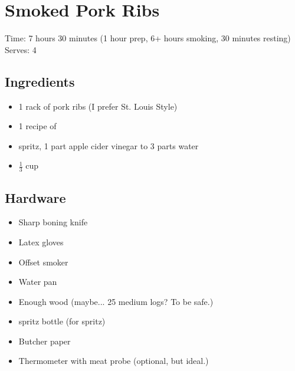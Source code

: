 \section{Smoked Pork Ribs}
\label{smokedPorkRibs}
\setcounter{secnumdepth}{0}
Time: 7 hours 30 minutes (1 hour prep, 6+ hours smoking, 30 minutes resting)
Serves: 4

\begin{multicols}{2}
\subsection*{Ingredients}
\begin{itemize}
    \item 1 rack of pork ribs (I prefer St. Louis Style)
    \item 1 recipe of 
    \item spritz, 1 part apple cider vinegar to 3 parts water
    \item \( \frac{1}{3} \) cup 
\end{itemize}

\subsection*{Hardware}
\begin{itemize}
    \item Sharp boning knife
    \item Latex gloves
    \item Offset smoker
    \item Water pan
    \item Enough wood (maybe... 25 medium logs? To be safe.)
    \item spritz bottle (for spritz)
    \item Butcher paper
    \item Thermometer with meat probe (optional, but ideal.)
\end{itemize}
\clearpage


\end{multicols}
